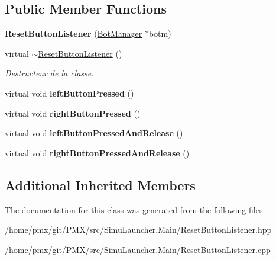 \subsection*{Public Member Functions}
\begin{DoxyCompactItemize}
\item 
\mbox{\label{classResetButtonListener_ab72a2c7d28b73f4ea18f847834095609}} 
{\bfseries Reset\+Button\+Listener} (\hyperlink{classBotManager}{Bot\+Manager} $\ast$botm)
\item 
\mbox{\label{classResetButtonListener_a79a4b3bbacdef95bcfa94196aa7cfdac}} 
virtual \hyperlink{classResetButtonListener_a79a4b3bbacdef95bcfa94196aa7cfdac}{$\sim$\+Reset\+Button\+Listener} ()
\begin{DoxyCompactList}\small\item\em Destructeur de la classe. \end{DoxyCompactList}\item 
\mbox{\label{classResetButtonListener_a29b2b465b3f96fc379b803b5b360f501}} 
virtual void {\bfseries left\+Button\+Pressed} ()
\item 
\mbox{\label{classResetButtonListener_a90f187fbf5a581575b5f5983ada7299a}} 
virtual void {\bfseries right\+Button\+Pressed} ()
\item 
\mbox{\label{classResetButtonListener_aaadc839bc43de68465aaa9be6dee116f}} 
virtual void {\bfseries left\+Button\+Pressed\+And\+Release} ()
\item 
\mbox{\label{classResetButtonListener_aaf3702d68776baa783a8e2b70ee851e5}} 
virtual void {\bfseries right\+Button\+Pressed\+And\+Release} ()
\end{DoxyCompactItemize}
\subsection*{Additional Inherited Members}


The documentation for this class was generated from the following files\+:\begin{DoxyCompactItemize}
\item 
/home/pmx/git/\+P\+M\+X/src/\+Simu\+Launcher.\+Main/Reset\+Button\+Listener.\+hpp\item 
/home/pmx/git/\+P\+M\+X/src/\+Simu\+Launcher.\+Main/Reset\+Button\+Listener.\+cpp\end{DoxyCompactItemize}
